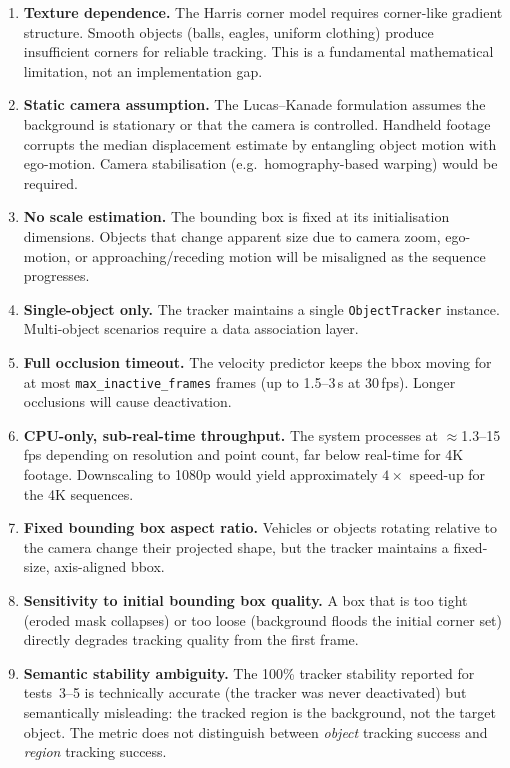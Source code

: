 \documentclass[12pt,a4paper]{article}
\begin{document}
\begin{enumerate}[leftmargin=1.8em]
  \item \textbf{Texture dependence.} The Harris corner model requires corner-like gradient
    structure. Smooth objects (balls, eagles, uniform clothing) produce insufficient corners for
    reliable tracking. This is a fundamental mathematical limitation, not an implementation gap.

  \item \textbf{Static camera assumption.} The Lucas--Kanade formulation assumes the background
    is stationary or that the camera is controlled. Handheld footage corrupts the median
    displacement estimate by entangling object motion with ego-motion. Camera stabilisation
    (e.g.\ homography-based warping) would be required.

  \item \textbf{No scale estimation.} The bounding box is fixed at its initialisation dimensions.
    Objects that change apparent size due to camera zoom, ego-motion, or approaching/receding
    motion will be misaligned as the sequence progresses.

  \item \textbf{Single-object only.} The tracker maintains a single \texttt{ObjectTracker}
    instance. Multi-object scenarios require a data association layer.

  \item \textbf{Full occlusion timeout.} The velocity predictor keeps the bbox moving for at
    most \texttt{max\_inactive\_frames} frames (up to 1.5--3\,s at 30\,fps). Longer occlusions
    will cause deactivation.

  \item \textbf{CPU-only, sub-real-time throughput.} The system processes at
    $\approx$1.3--15\,fps depending on resolution and point count, far below real-time for
    4K footage. Downscaling to 1080p would yield approximately $4\times$ speed-up for the
    4K sequences.

  \item \textbf{Fixed bounding box aspect ratio.} Vehicles or objects rotating relative to the
    camera change their projected shape, but the tracker maintains a fixed-size, axis-aligned
    bbox.

  \item \textbf{Sensitivity to initial bounding box quality.} A box that is too tight (eroded
    mask collapses) or too loose (background floods the initial corner set) directly degrades
    tracking quality from the first frame.

  \item \textbf{Semantic stability ambiguity.} The 100\% tracker stability reported for
    tests~3--5 is technically accurate (the tracker was never deactivated) but semantically
    misleading: the tracked region is the background, not the target object. The metric does
    not distinguish between \emph{object} tracking success and \emph{region} tracking success.
\end{enumerate}
\end{document}
